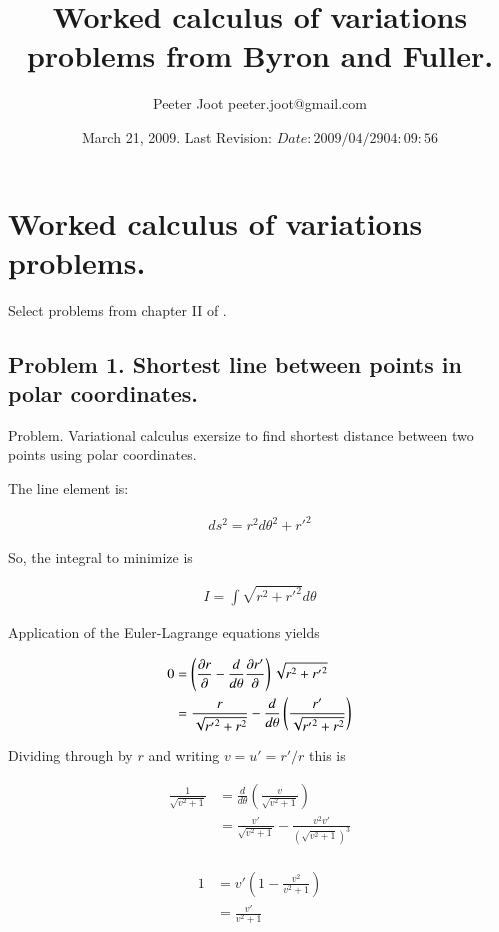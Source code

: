 \documentclass{article}
\title{ Worked calculus of variations problems from Byron and Fuller. }
\author{Peeter Joot \quad peeter.joot@gmail.com }
\date{ March 21, 2009.  Last Revision: $Date: 2009/04/29 04:09:56 $ }
\begin{document}
\maketitle{}
\tableofcontents

\section{ Worked calculus of variations problems. }

Select problems from chapter II of \cite{byron1992mca}.

\subsection{ Problem 1.  Shortest line between points in polar coordinates. }

Problem.  Variational calculus exersize to find shortest distance between two points using polar coordinates.
 
The line element is:
 
\begin{align*}
ds^2 = r^2 d\theta^2 + {r'}^2
\end{align*}
 
So, the integral to minimize is
 
\begin{align*}
I = \int \sqrt{ r^2 + {r'}^2 } d\theta
\end{align*}
 
Application of the Euler-Lagrange equations yields
 
\begin{align*}
0 
&= \left( \frac{\partial{r}}{\partial {}} - \frac{d}{d\theta} \frac{\partial{r'}}{\partial {}} \right) \sqrt{ r^2 + {r'}^2 }  \\
&= \frac{r}{\sqrt{{r'}^2 + r^2}} - \frac{d}{d\theta} \left( \frac{{r'}}{\sqrt{{r'}^2 + r^2}}\right) \\
\end{align*}
 
Dividing through by $r$ and writing $v = u' = {r'}/r$ this is
 
\begin{align*}
\frac{1}{\sqrt{v^2 + 1}}
&= \frac{d}{d\theta} \left( \frac{v}{\sqrt{v^2 + 1}}\right) \\
&= \frac{v'}{\sqrt{v^2 + 1}} -\frac{v^2 v'}{(\sqrt{v^2 + 1})^3} \\
\end{align*}
 
\begin{align*}
1 
&= v' \left( 1 -\frac{v^2 }{v^2 + 1} \right) \\
&= \frac{v'}{v^2 + 1} \\
\end{align*}
\end{document}

